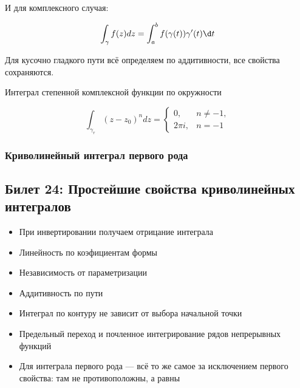 \documentclass[12pt, a4paper]{book}
\begin{document}
И для комплексного случая:

\begin{equation}
    \int_\gamma f(z) d z=\int_a^b f(\gamma(t)) \gamma^{\prime}(t) \d t
\end{equation}

\begin{remark}
    Для кусочно гладкого пути всё определяем по аддитивности, все свойства сохраняются.
\end{remark}


\begin{example}
    Интеграл степенной комплексной функции по окружности
    
    \begin{equation}
        \int_{\gamma_r}\left(z-z_0\right)^n d z = \begin{cases} 0, & n \neq-1, \\ 2 \pi i, & n=-1 \end{cases}
    \end{equation}
\end{example}


\subsubsection{Криволинейный интеграл \textbf{первого} рода}



\subsection{Билет 24: Простейшие свойства криволинейных интегралов}

\begin{itemize}
    \item При инвертировании получаем отрицание интеграла
    \item Линейность по коэфициентам формы
    \item Независимость от параметризации
    \item Аддитивность по пути
    \item Интеграл по контуру не зависит от выбора начальной точки
    \item Предельный переход и почленное интегрирование рядов непрерывных функций
    \item Для интеграла первого рода — всё то же самое за исключением первого свойства: там не противоположны, а равны
\end{itemize}
\end{document}
